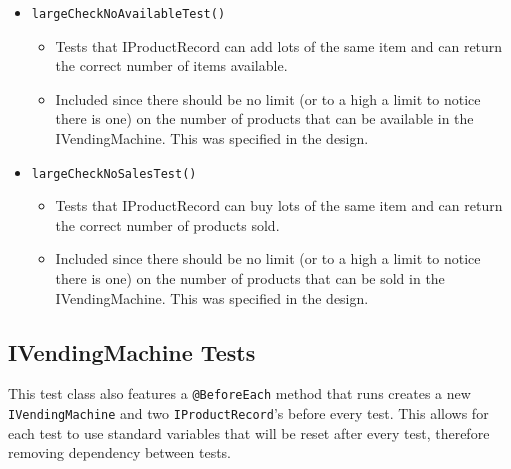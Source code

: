 \documentclass{article}
\begin{document}
\begin{itemize}
\item \verb+largeCheckNoAvailableTest()+
\begin{itemize}
\item Tests that IProductRecord can add lots of the same item and can return the correct number of items available.
\item Included since there should be no limit (or to a high a limit to notice there is one) on the number of products that can be available in the IVendingMachine. This was specified in the design.
\end{itemize}

\item \verb+largeCheckNoSalesTest()+
\begin{itemize}
\item Tests that IProductRecord can buy lots of the same item and can return the correct number of products sold.
\item Included since there should be no limit (or to a high a limit to notice there is one) on the number of products that can be sold in the IVendingMachine. This was specified in the design.
\end{itemize}
\end{itemize}




\subsection{IVendingMachine Tests}
This test class also features a \verb+@BeforeEach+ method that runs creates a new \verb+IVendingMachine+ and two \verb+IProductRecord+'s before every test. This allows for each test to use standard variables that will be reset after every test, therefore removing dependency between tests.
\end{document}

